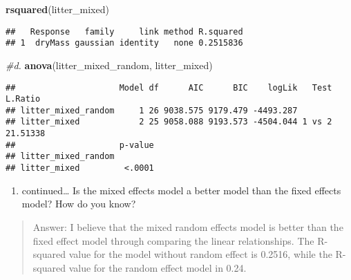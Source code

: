 \documentclass[]{article}
\newenvironment{Shaded}{\begin{snugshade}}{\end{snugshade}}
\newcommand{\CommentTok}[1]{\textcolor[rgb]{0.56,0.35,0.01}{\textit{#1}}}
\newcommand{\KeywordTok}[1]{\textcolor[rgb]{0.13,0.29,0.53}{\textbf{#1}}}
\newcommand{\NormalTok}[1]{#1}
\providecommand{\tightlist}{%
  \setlength{\itemsep}{0pt}\setlength{\parskip}{0pt}}
\begin{document}
\begin{Shaded}
\begin{Highlighting}[]
\KeywordTok{rsquared}\NormalTok{(litter_mixed)}
\end{Highlighting}
\end{Shaded}

\begin{verbatim}
##   Response   family     link method R.squared
## 1  dryMass gaussian identity   none 0.2515836
\end{verbatim}

\begin{Shaded}
\begin{Highlighting}[]
\CommentTok{#d.}
\KeywordTok{anova}\NormalTok{(litter_mixed_random, litter_mixed)}
\end{Highlighting}
\end{Shaded}

\begin{verbatim}
##                     Model df      AIC      BIC    logLik   Test  L.Ratio
## litter_mixed_random     1 26 9038.575 9179.479 -4493.287                
## litter_mixed            2 25 9058.088 9193.573 -4504.044 1 vs 2 21.51338
##                     p-value
## litter_mixed_random        
## litter_mixed         <.0001
\end{verbatim}

\begin{enumerate}
\def\labelenumi{\alph{enumi}.}
\setcounter{enumi}{3}
\tightlist
\item
  continued\ldots{} Is the mixed effects model a better model than the
  fixed effects model? How do you know?
\end{enumerate}

\begin{quote}
Answer: I believe that the mixed random effects model is better than the
fixed effect model through comparing the linear relationships. The
R-squared value for the model without random effect is 0.2516, while the
R-squared value for the random effect model in 0.24.
\end{quote}
\end{document}
